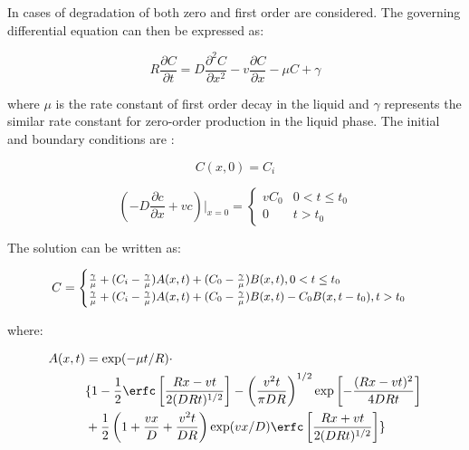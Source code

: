In \cite{Genuchtenanalytical} cases of degradation of both zero
and first order are considered. The governing differential equation can
then be expressed as:

\begin{equation}
R\frac{\partial C}{\partial t}=D\frac{\partial^2C}{\partial
  x^2}-v\frac{\partial C}{\partial x}-\mu C +\gamma
\end{equation}

where $\mu$ is the rate constant of first order decay in the liquid
and $\gamma$ represents the similar rate constant for zero-order
production in the liquid phase. The initial and boundary conditions
are :

\begin{equation}
C(x,0)=C_i
\end{equation}

\begin{equation}
(-D\frac{\partial c}{\partial x}+vc)|_{x=0}=\begin{cases} vC_0 &
  0<t\leq t_0 \\ 0 & t>t_0 \end{cases}
\end{equation}

The solution can be written as:

\begin{equation}
\begin{small}
C=\begin{cases}\frac{\gamma}{\mu}+ (C_i-\frac{\gamma}{\mu})A(x,t)+(C_0-\frac{\gamma}{\mu})B(x,t), 0<t\leq t_0 \\
\frac{\gamma}{\mu} + (C_i-\frac{\gamma}{\mu})A(x,t)+(C_0-\frac{\gamma}{\mu})B(x,t)-C_0B(x,t-t_0), t>t_0
\end{cases}
\end{small}
\end{equation}

where:


\begin{equation}
\begin{split}
A(x,t) & =\exp(-\mu t/R)\cdot \\
& \{ 1-\frac{1}{2}\erfc\left[\frac{Rx-vt}{2(DRt)^{1/2}}\right]
-\left(\frac{v^2t}{\pi
    DR}\right)^{1/2}\exp\left[-\frac{(Rx-vt)^2}{4DRt}\right] \\ &
+\frac{1}{2}\left(1+\frac{vx}{D}+\frac{v^2t}{DR}\right)\exp(vx/D)\erfc\left[\frac{Rx+vt}{2(DRt)^{1/2}}\right]
\}
\end{split}
\end{equation}

